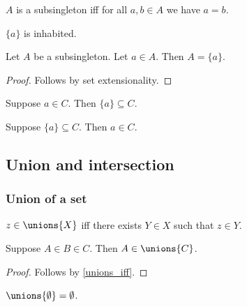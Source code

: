 \begin{abbreviation}\label{subsingleton}
    $A$ is a subsingleton iff for all $a, b\in A$ we have $a = b$.
\end{abbreviation}

\begin{proposition}\label{singleton_inhabited}
    $\{a\}$ is inhabited.
\end{proposition}

\begin{proposition}\label{singleton_iff_inhabited_subsingleton}
    Let $A$ be a subsingleton.
    Let $a\in A$.
    Then $A = \{a\}$.
\end{proposition}
\begin{proof}
    Follows by set extensionality.
\end{proof}

\begin{proposition}\label{singleton_subset_intro}
    Suppose $a\in C$.
    Then $\{a\}\subseteq C$.
\end{proposition}

\begin{proposition}\label{singleton_subset_elim}
    Suppose $\{a\}\subseteq C$.
    Then $a\in C$.
\end{proposition}


\subsection{Union and intersection}

\subsubsection{Union of a set}

\begin{axiom}\label{unions_iff}
    $z\in\unions{X}$ iff there exists $Y\in X$ such that $z\in Y$.
\end{axiom}


\begin{proposition}%
\label{unions_intro}
    Suppose $A\in B\in C$.
    Then $A\in\unions{C}$.
\end{proposition}
\begin{proof}
    Follows by \cref{unions_iff}.
\end{proof}

\begin{proposition}\label{unions_emptyset}
    $\unions{\emptyset} = \emptyset$.
\end{proposition}

